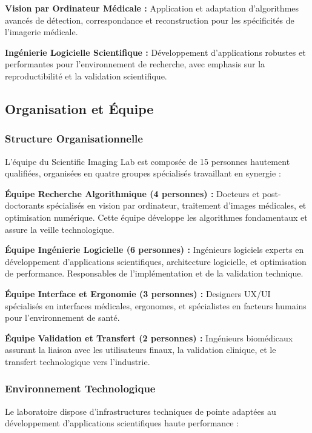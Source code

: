 \documentclass[12pt,a4paper]{article}
\begin{document}
\textbf{Vision par Ordinateur Médicale :} Application et adaptation d'algorithmes avancés de détection, correspondance et reconstruction pour les spécificités de l'imagerie médicale.

\textbf{Ingénierie Logicielle Scientifique :} Développement d'applications robustes et performantes pour l'environnement de recherche, avec emphasis sur la reproductibilité et la validation scientifique.

\subsection{Organisation et Équipe}

\subsubsection{Structure Organisationnelle}

L'équipe du Scientific Imaging Lab est composée de 15 personnes hautement qualifiées, organisées en quatre groupes spécialisés travaillant en synergie :

\textbf{Équipe Recherche Algorithmique (4 personnes) :} Docteurs et post-doctorants spécialisés en vision par ordinateur, traitement d'images médicales, et optimisation numérique. Cette équipe développe les algorithmes fondamentaux et assure la veille technologique.

\textbf{Équipe Ingénierie Logicielle (6 personnes) :} Ingénieurs logiciels experts en développement d'applications scientifiques, architecture logicielle, et optimisation de performance. Responsables de l'implémentation et de la validation technique.

\textbf{Équipe Interface et Ergonomie (3 personnes) :} Designers UX/UI spécialisés en interfaces médicales, ergonomes, et spécialistes en facteurs humains pour l'environnement de santé.

\textbf{Équipe Validation et Transfert (2 personnes) :} Ingénieurs biomédicaux assurant la liaison avec les utilisateurs finaux, la validation clinique, et le transfert technologique vers l'industrie.

\subsubsection{Environnement Technologique}

Le laboratoire dispose d'infrastructures techniques de pointe adaptées au développement d'applications scientifiques haute performance :
\end{document}
